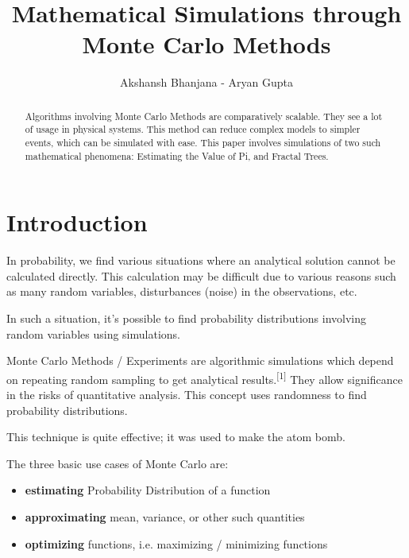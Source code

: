 \documentclass{resonance}
\begin{document}
\title{Mathematical Simulations through Monte Carlo Methods}
\author{Akshansh Bhanjana - Aryan Gupta}

\maketitle
{}

\begin{abstract}
Algorithms involving Monte Carlo Methods are comparatively scalable. They see a lot of usage in physical systems. This method can reduce complex models to simpler events, which can be simulated with ease. This paper involves simulations of two such mathematical phenomena: Estimating the Value of Pi, and Fractal Trees.
\end{abstract}



\section*{Introduction}
In probability, we find various situations where an analytical solution cannot be calculated directly. This calculation may be difficult due to various reasons such as many random variables, disturbances (noise) in the observations, etc.

In such a situation, it's possible to find probability distributions involving random variables using simulations.

Monte Carlo Methods / Experiments are algorithmic simulations which depend on repeating random sampling to get analytical results.\textsuperscript{[1]} They allow significance in the risks of quantitative analysis. This concept uses randomness to find probability distributions.

This technique is quite effective; it was used to make the atom bomb.

The three basic use cases of Monte Carlo are:
\begin{itemize}
    \item \textbf{estimating} Probability Distribution of a function
    \item \textbf{approximating} mean, variance, or other such quantities
    \item \textbf{optimizing} functions, i.e. maximizing / minimizing functions
\end{itemize}
\end{document}
